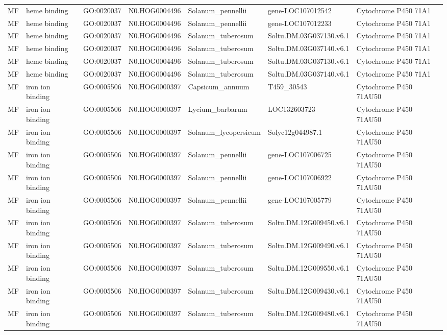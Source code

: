 \begin{table}
\begin{tabular}[t]{lllllll}
MF & heme binding & GO:0020037 & N0.HOG0004496 & Solanum\_pennellii & gene-LOC107012542 & Cytochrome P450 71A1\\
MF & heme binding & GO:0020037 & N0.HOG0004496 & Solanum\_pennellii & gene-LOC107012233 & Cytochrome P450 71A1\\
MF & heme binding & GO:0020037 & N0.HOG0004496 & Solanum\_tuberosum & Soltu.DM.03G037130.v6.1 & Cytochrome P450 71A1\\
MF & heme binding & GO:0020037 & N0.HOG0004496 & Solanum\_tuberosum & Soltu.DM.03G037140.v6.1 & Cytochrome P450 71A1\\
MF & heme binding & GO:0020037 & N0.HOG0004496 & Solanum\_tuberosum & Soltu.DM.03G037130.v6.1 & Cytochrome P450 71A1\\
MF & heme binding & GO:0020037 & N0.HOG0004496 & Solanum\_tuberosum & Soltu.DM.03G037140.v6.1 & Cytochrome P450 71A1\\
MF & iron ion binding & GO:0005506 & N0.HOG0000397 & Capsicum\_annuum & T459\_30543 & Cytochrome P450 71AU50\\
MF & iron ion binding & GO:0005506 & N0.HOG0000397 & Lycium\_barbarum & LOC132603723 & Cytochrome P450 71AU50\\
MF & iron ion binding & GO:0005506 & N0.HOG0000397 & Solanum\_lycopersicum & Solyc12g044987.1 & Cytochrome P450 71AU50\\
MF & iron ion binding & GO:0005506 & N0.HOG0000397 & Solanum\_pennellii & gene-LOC107006725 & Cytochrome P450 71AU50\\
MF & iron ion binding & GO:0005506 & N0.HOG0000397 & Solanum\_pennellii & gene-LOC107006922 & Cytochrome P450 71AU50\\
MF & iron ion binding & GO:0005506 & N0.HOG0000397 & Solanum\_pennellii & gene-LOC107005779 & Cytochrome P450 71AU50\\
MF & iron ion binding & GO:0005506 & N0.HOG0000397 & Solanum\_tuberosum & Soltu.DM.12G009450.v6.1 & Cytochrome P450 71AU50\\
MF & iron ion binding & GO:0005506 & N0.HOG0000397 & Solanum\_tuberosum & Soltu.DM.12G009490.v6.1 & Cytochrome P450 71AU50\\
MF & iron ion binding & GO:0005506 & N0.HOG0000397 & Solanum\_tuberosum & Soltu.DM.12G009550.v6.1 & Cytochrome P450 71AU50\\
MF & iron ion binding & GO:0005506 & N0.HOG0000397 & Solanum\_tuberosum & Soltu.DM.12G009430.v6.1 & Cytochrome P450 71AU50\\
MF & iron ion binding & GO:0005506 & N0.HOG0000397 & Solanum\_tuberosum & Soltu.DM.12G009480.v6.1 & Cytochrome P450 71AU50\\

\end{tabular}
\end{table}
